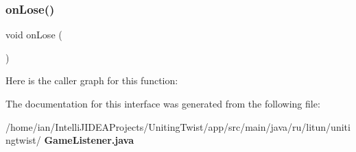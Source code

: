 \subsubsection{on\+Lose()}
{\footnotesize\ttfamily void on\+Lose (\begin{DoxyParamCaption}{ }\end{DoxyParamCaption})}

Here is the caller graph for this function\+:


The documentation for this interface was generated from the following file\+:\begin{DoxyCompactItemize}
\item 
/home/ian/\+Intelli\+J\+I\+D\+E\+A\+Projects/\+Uniting\+Twist/app/src/main/java/ru/litun/unitingtwist/\textbf{ Game\+Listener.\+java}\end{DoxyCompactItemize}
